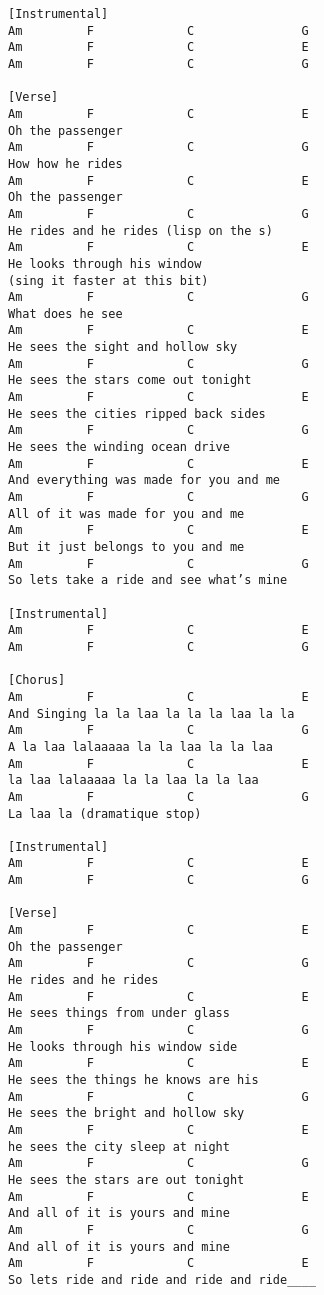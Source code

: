 \documentclass{article}
\begin{document}
\begin{verbatim}
[Instrumental]
Am         F             C               G
Am         F             C               E
Am         F             C               G

[Verse]
Am         F             C               E
Oh the passenger
Am         F             C               G
How how he rides
Am         F             C               E
Oh the passenger
Am         F             C               G
He rides and he rides (lisp on the s)
Am         F             C               E
He looks through his window 
(sing it faster at this bit)
Am         F             C               G
What does he see
Am         F             C               E
He sees the sight and hollow sky
Am         F             C               G
He sees the stars come out tonight
Am         F             C               E
He sees the cities ripped back sides
Am         F             C               G
He sees the winding ocean drive
Am         F             C               E
And everything was made for you and me
Am         F             C               G
All of it was made for you and me
Am         F             C               E
But it just belongs to you and me
Am         F             C               G
So lets take a ride and see what’s mine

[Instrumental]
Am         F             C               E
Am         F             C               G

[Chorus]
Am         F             C               E
And Singing la la laa la la la laa la la
Am         F             C               G
A la laa lalaaaaa la la laa la la laa
Am         F             C               E
la laa lalaaaaa la la laa la la laa
Am         F             C               G
La laa la (dramatique stop)

[Instrumental]
Am         F             C               E
Am         F             C               G

[Verse]
Am         F             C               E
Oh the passenger
Am         F             C               G
He rides and he rides
Am         F             C               E
He sees things from under glass
Am         F             C               G
He looks through his window side
Am         F             C               E
He sees the things he knows are his
Am         F             C               G
He sees the bright and hollow sky
Am         F             C               E
he sees the city sleep at night
Am         F             C               G
He sees the stars are out tonight
Am         F             C               E
And all of it is yours and mine
Am         F             C               G
And all of it is yours and mine
Am         F             C               E
So lets ride and ride and ride and ride____


\end{verbatim}
\end{document}

